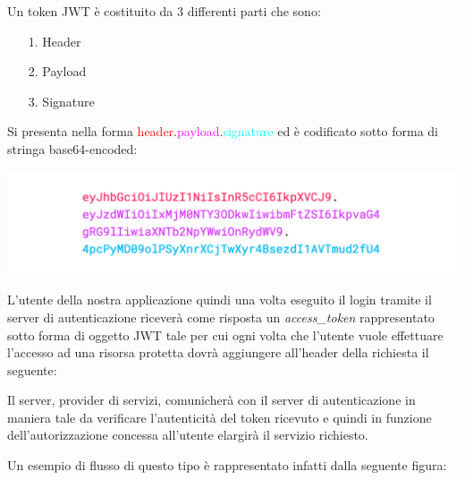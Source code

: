 \documentclass[twoside]{report}
\begin{document}
Un token JWT è costituito da 3 differenti parti che sono:

\begin{itemize}
    \item[1.] Header
    \item[2.] Payload
    \item[3.] Signature
\end{itemize}

Si presenta nella forma \textcolor{red}{header}.\textcolor{magenta}{payload}.\textcolor{cyan}{signature} ed è codificato sotto forma di stringa base64-encoded:

\begin{center}
\begin{minipage}{\linewidth}
    \vspace{2mm}
    \centering
    \includegraphics[width= \linewidth]{1.png}
    \vspace{2mm}
\end{minipage}

\end{center}

L'utente della nostra applicazione quindi una volta eseguito il login tramite il server di autenticazione riceverà come risposta un \textit{access\_token} rappresentato sotto forma di oggetto JWT tale per cui ogni volta che l'utente vuole effettuare l'accesso ad una risorsa protetta dovrà aggiungere all'header della richiesta il seguente:
\begin{center}

\end{center}

Il server, provider di servizi, comunicherà con il server di autenticazione in maniera tale da verificare l'autenticità del token ricevuto e quindi in funzione dell'autorizzazione concessa all'utente elargirà il servizio richiesto.

Un esempio di flusso di questo tipo è rappresentato infatti dalla seguente figura:
\end{document}
